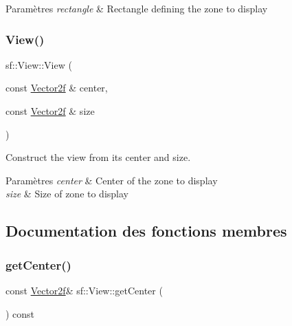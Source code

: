 \begin{DoxyParams}{Paramètres}
{\em rectangle} & Rectangle defining the zone to display \\
\hline
\end{DoxyParams}
\mbox{\label{classsf_1_1View_afdaf84cfc910ef160450d63603457ea4}} 
\subsubsection{\texorpdfstring{View()}{View()}\hspace{0.1cm}{\footnotesize\ttfamily [3/3]}}
{\footnotesize\ttfamily sf\+::\+View\+::\+View (\begin{DoxyParamCaption}\item[{const \hyperlink{classsf_1_1Vector2}{Vector2f} \&}]{center,  }\item[{const \hyperlink{classsf_1_1Vector2}{Vector2f} \&}]{size }\end{DoxyParamCaption})}



Construct the view from its center and size. 


\begin{DoxyParams}{Paramètres}
{\em center} & Center of the zone to display \\
\hline
{\em size} & Size of zone to display \\
\hline
\end{DoxyParams}


\subsection{Documentation des fonctions membres}
\mbox{\label{classsf_1_1View_a7f4443c194c691ae4dcf8fd9dd0eaa46}} 
\subsubsection{\texorpdfstring{get\+Center()}{getCenter()}}
{\footnotesize\ttfamily const \hyperlink{classsf_1_1Vector2}{Vector2f}\& sf\+::\+View\+::get\+Center (\begin{DoxyParamCaption}{ }\end{DoxyParamCaption}) const}



